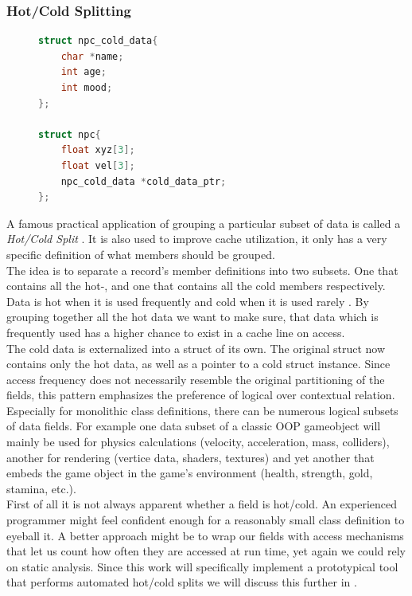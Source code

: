 \subsubsection{Hot/Cold Splitting}\label{hot_cold_splitting}
\begin{figure}
\begin{lstlisting}[language=C++,numbers=none,name={The NPC class splitted into hot/cold data},label={hcsplit_npc}]
struct npc_cold_data{
	char *name;
	int age;
	int mood;
};

struct npc{
	float xyz[3];
	float vel[3];
	npc_cold_data *cold_data_ptr;
};
\end{lstlisting}
\end{figure}
A famous practical application of grouping a particular subset of data is called a \textit{Hot/Cold Split} . It is also used to improve cache utilization, it only has a very specific definition of what members should be grouped.\\
The idea is to separate a record's member definitions into two subsets. One that contains all the hot-, and one that contains all the cold members respectively. Data is hot when it is used frequently and cold when it is used rarely . By grouping together all the hot data we want to make sure, that data which is frequently used has a higher chance to exist in a cache line on access.\\
The cold data is externalized into a struct of its own. The original struct now contains only the hot data, as well as a pointer to a cold struct instance. Since access frequency does not necessarily resemble the original partitioning of the fields, this pattern emphasizes the preference of logical over contextual relation.\\
Especially for monolithic class definitions, there can be numerous logical subsets of data fields. For example one data subset of a classic OOP gameobject will mainly be used for physics calculations (velocity, acceleration, mass, colliders), another for rendering (vertice data, shaders, textures) and yet another that embeds the game object in the game's environment (health, strength, gold, stamina, etc.).\\
First of all it is not always apparent whether a field is hot/cold. An experienced programmer might feel confident enough for a reasonably small class definition to eyeball it. A better approach might be to wrap our fields with access mechanisms that let us count how often they are accessed at run time, yet again we could rely on static analysis. Since this work will specifically implement a prototypical tool that performs automated hot/cold splits we will discuss this further in .\\
